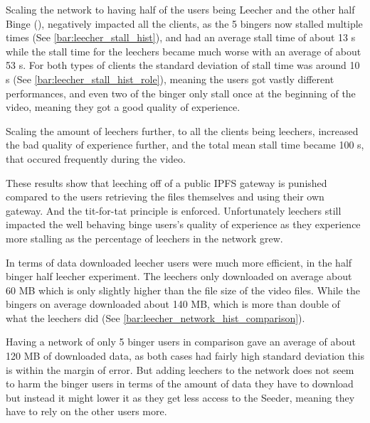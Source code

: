 Scaling the network to having half of the users being Leecher and the other half Binge (), negatively impacted all the clients, as the 5 bingers now stalled multiple times (See \autoref{bar:leecher_stall_hist}), and had an average stall time of about 13 \acs{s} while the stall time for the leechers became much worse with an average of about 53 \acs{s}. For both types of clients the standard deviation of stall time was around 10 \acs{s} (See \autoref{bar:leecher_stall_hist_role}), meaning the users got vastly different performances, and even two of the binger only stall once at the beginning of the video, meaning they got a good quality of experience.






%

Scaling the amount of leechers further, to all the clients being leechers, increased the bad quality of experience further, and the total mean stall time became 100 \acs{s}, that occured frequently during the video.

These results show that leeching off of a public \ac{IPFS} gateway is punished compared to the users retrieving the files themselves and using their own gateway. And the tit-for-tat principle is enforced. Unfortunately leechers still impacted the well behaving binge users's quality of experience as they experience more stalling as the percentage of leechers in the network grew.

In terms of data downloaded leecher users were much more efficient, in the half binger half leecher experiment. The leechers only downloaded on average about 60 \ac{MB} which is only slightly higher than the file size of the video files. While the bingers on average downloaded about 140 \ac{MB}, which is more than double of what the leechers did (See \autoref{bar:leecher_network_hist_comparison}). 


Having a network of only 5 binger users in comparison gave an average of about 120 \ac{MB} of downloaded data, as both cases had fairly high standard deviation this is within the margin of error. But adding leechers to the network does not seem to harm the binger users in terms of the amount of data they have to download but instead it might lower it as they get less access to the Seeder, meaning they have to rely on the other users more.

